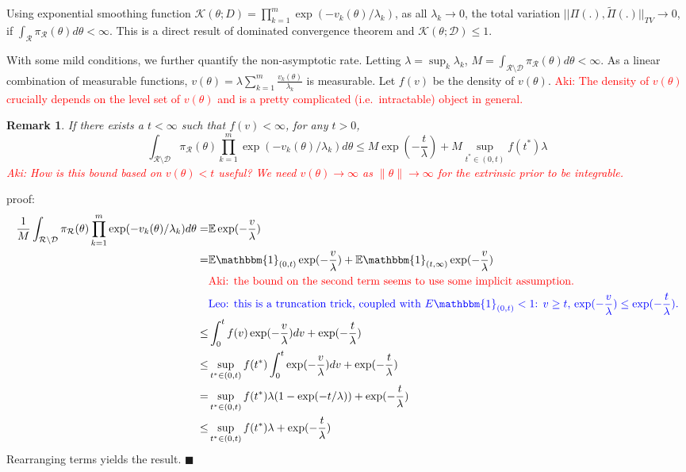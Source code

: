 \documentclass[10pt]{article}
\newcommand{\leo}[1]{{\color{blue}{Leo: #1}}}
\newcommand{\aki}[1]{\textcolor{red}{Aki: #1}}
\newtheorem{remark}{Remark}
\newcommand{\mc}[1]{\mathcal{#1}}
\DeclareMathOperator{\1}{\mathbbm{1}}
\begin{document}
Using exponential smoothing function $\mc K(\theta; D) = \prod_{k=1}^m \exp( -v_k(\theta)/\lambda_k)$, as all $\lambda_k \rightarrow 0$, the total variation $||\Pi(.), \tilde{\Pi}(.) ||_{TV} \rightarrow 0$, if $\int_{\mc R} \pi_{\mc R}(\theta) d\theta<\infty$. This is a direct result of dominated convergence theorem and $\mc K(\theta; \mc D)\le 1$.


With some mild conditions, we further quantify the non-asymptotic rate. Letting $\lambda = \sup_k \lambda_k$, $M= \int_{\mc R \setminus \mc D} \pi_{\mc R}(\theta) d\theta<\infty$. As a linear combination of measurable functions, $v(\theta)=\lambda\sum_{k=1}^m\frac{ v_k(\theta)}{\lambda_k}$ is measurable. Let $f(v)$ be the density of $v(\theta)$. \aki{The density of $v(\theta)$ crucially depends on the level set of $v(\theta)$ and is a pretty complicated (i.e.\ intractable) object in general.}

\begin{remark}
\label{convergence_rate}
If there exists a $t<\infty$ such that $f(v) < \infty$, for any $t>0$,
$$\int_{\mc R \setminus \mc D} {\pi_{\mc R}(\theta)} \prod_{k=1}^m \exp( -v_k(\theta)/\lambda_k) d \theta \le 
 {M} \exp(-\frac{t}{\lambda}) + {M} \sup_{t^*\in(0,t)} {f(t^*)}\lambda 
$$
\aki{How is this bound based on $v(\theta) < t$ useful? We need $v(\theta) \to \infty$ as $\| \theta \| \to \infty$ for the extrinsic prior to be integrable. }\leo{I rephrased the statement}
\end{remark}
proof:
\begin{equation}
\begin{aligned}
\frac{1}{M}\int_{\mc R \setminus \mc D} {\pi_{\mc R}(\theta)} \prod_{k=1}^m \exp( -v_k(\theta)/\lambda_k) d \theta = & 
\mathbb{E} \exp(- \frac{v}{\lambda}) \\
= & \mathbb{E} \mathbbm{1}_{(0,t)} \exp(- \frac{v}{\lambda}) +  \mathbb{E} \mathbbm{1}_{(t,\infty)} \exp(- \frac{v}{\lambda}) \\
& \text{\aki{the bound on the second term seems to use some implicit assumption.}} \\
& \text{\leo{this is a truncation trick, coupled with $E\mathbbm{1}_{(0,t)}<1$: $v\ge t$, $\exp(- \frac{v}{\lambda})\le \exp(- \frac{t}{\lambda})$.}}\\
\le & \int_0^t f(v) \exp(- \frac{v}{\lambda}) dv + \exp(-\frac{t}{\lambda}) \\
\le & \sup_{t^*\in(0,t)} f(t^*) \int_0^t \exp(- \frac{v}{\lambda}) dv + \exp(-\frac{t}{\lambda}) \\
= & \sup_{t^*\in(0,t)} f(t^*)  \lambda (1- \exp(-t/\lambda)) + \exp(-\frac{t}{\lambda}) \\
\le  & \sup_{t^*\in(0,t)} f(t^*)  \lambda  + \exp(-\frac{t}{\lambda}) \\
\end{aligned}
\end{equation}
Rearranging terms yields the result.  $\blacksquare$
\end{document}
